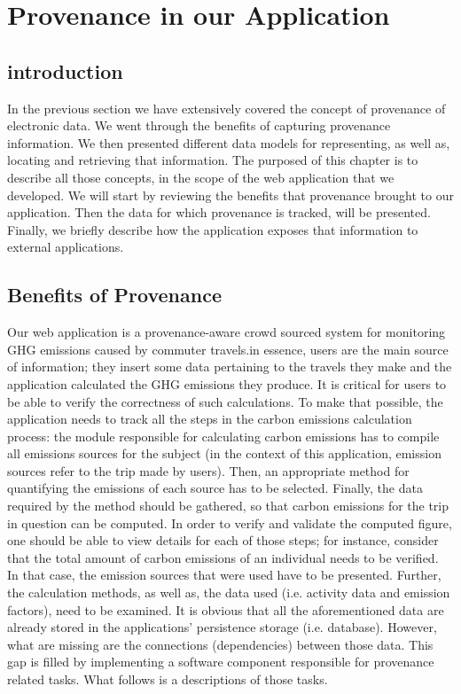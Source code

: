 
\chapter{Provenance in our Application} %
\label{Provenance in our Application}

\section{introduction}

In the previous section we have extensively covered the concept of provenance of electronic data. We went through the benefits of capturing provenance information. We then presented different data models for representing, as well as, locating and retrieving that information. The purposed of this chapter is to describe all those concepts, in the scope of the web application that we developed. We will start by reviewing the benefits that provenance brought to our application. Then the data for which provenance is tracked, will be presented. Finally, we briefly describe how the application exposes that information to external applications.

\section{Benefits of Provenance}

Our web application is a provenance-aware crowd sourced system for monitoring GHG emissions caused by commuter travels.in essence, users are the main source of information; they insert some data pertaining to the travels they make and the application calculated the GHG emissions they produce. It is critical for users to be able to verify the correctness of such calculations. To make that possible, the application needs to track all the steps in the carbon emissions calculation process: the module responsible for calculating carbon emissions has to compile all emissions sources for the subject (in the context of this application, emission sources refer to the trip made by users). Then, an appropriate method for quantifying the emissions of each source has to be selected. Finally, the data required by the method should be gathered, so that carbon emissions for the trip in question can be computed.
In order to verify and validate the computed figure, one should be able to view details for each of those steps; for instance, consider that the total amount of carbon emissions of an individual needs to be verified. In that case, the emission sources that were used have to be presented. Further, the calculation methods, as well as, the data used (i.e. activity data and emission factors), need to be examined.
It is obvious that all the aforementioned data are already stored in the applications' persistence storage (i.e. database). However, what are missing are the connections (dependencies) between those data. This gap is filled by implementing a software component responsible for provenance related tasks. What follows is a descriptions of those tasks.
 
